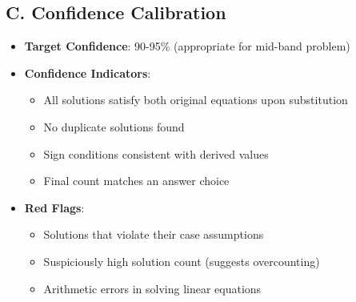 \documentclass[]{article}
\begin{document}
\begin{verificationbox}
\subsection*{C. Confidence Calibration}
\begin{itemize}[leftmargin=*]
    \item \textbf{Target Confidence}: 90-95\% (appropriate for mid-band problem)
    \item \textbf{Confidence Indicators}:
    \begin{itemize}
        \item All solutions satisfy both original equations upon substitution
        \item No duplicate solutions found
        \item Sign conditions consistent with derived values
        \item Final count matches an answer choice
    \end{itemize}
    \item \textbf{Red Flags}:
    \begin{itemize}
        \item Solutions that violate their case assumptions
        \item Suspiciously high solution count (suggests overcounting)
        \item Arithmetic errors in solving linear equations
    \end{itemize}
\end{itemize}
\end{verificationbox}
\end{document}
